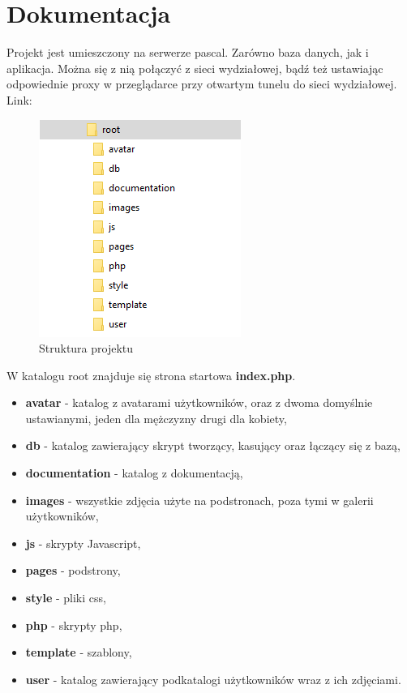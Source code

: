 \documentclass[a4paper,10pt,table]{article}
\begin{document}
\section{Dokumentacja}
Projekt jest umieszczony na serwerze pascal. Zarówno baza danych, jak i aplikacja. Można się z nią połączyć z sieci wydziałowej, bądź też ustawiając odpowiednie proxy w przeglądarce przy otwartym tunelu do sieci wydziałowej. Link:
\begin{center}
\href{http://pascal.fis.agh.edu.pl/~3kubicki/root/index.php}{\color{blue}{Twarzoksiążka Homepage}}
\end{center}

\begin{figure}[h]
\begin{center}
\includegraphics[scale=1]{folder}
\caption{Struktura projektu}
\end{center}
\end{figure}
W katalogu root znajduje się strona startowa \textbf{index.php}.
\begin{itemize}
\item \textbf{avatar} - katalog z avatarami użytkowników, oraz z dwoma domyślnie ustawianymi, jeden dla mężczyzny drugi dla kobiety,
\item \textbf{db} - katalog zawierający skrypt tworzący, kasujący oraz łączący się z bazą,
\item \textbf{documentation} - katalog z dokumentacją,
\item \textbf{images} - wszystkie zdjęcia użyte na podstronach, poza tymi w galerii użytkowników,
\item \textbf{js} - skrypty Javascript,
\item \textbf{pages} - podstrony,
\item \textbf{style} - pliki css,
\item \textbf{php} - skrypty php,
\item \textbf{template} - szablony,
\item \textbf{user} - katalog zawierający podkatalogi użytkowników wraz z ich zdjęciami.
\end{itemize}
\end{document}
